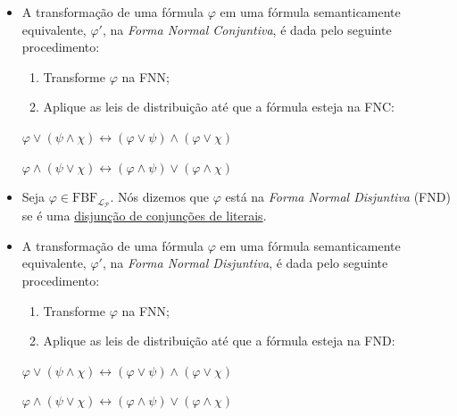 \begin{itemize}[left=0.5cm, align=left, nosep]
            \item A transformação de uma fórmula $\varphi$ em uma fórmula semanticamente equivalente, $\varphi'$, na 
            \textit{Forma Normal Conjuntiva}, é dada pelo seguinte procedimento:
            \begin{enumerate}[left=0.5cm, align=left, nosep]
                \item Transforme $\varphi$ na FNN;
                \item Aplique as leis de distribuição até que a fórmula esteja na FNC:
            \end{enumerate}

                \hspace{2cm} $\varphi \vee (\psi \wedge \chi) \leftrightarrow (\varphi \vee \psi) \wedge (\varphi \vee \chi)$

                \hspace{2cm} $\varphi \wedge (\psi \vee \chi) \leftrightarrow (\varphi \wedge \psi) \vee (\varphi \wedge \chi)$
            
            \item Seja $\varphi \in \text{FBF}_{\mathcal{L_P}}$. Nós dizemos que $\varphi$ está na \textit{Forma Normal Disjuntiva}
            (FND) se é uma \underline{disjunção de conjunções de literais}.

            \item A transformação de uma fórmula $\varphi$ em uma fórmula semanticamente equivalente, $\varphi'$, na 
            \textit{Forma Normal Disjuntiva}, é dada pelo seguinte procedimento:
            \begin{enumerate}[left=0.5cm, align=left, nosep]
                \item Transforme $\varphi$ na FNN;
                \item Aplique as leis de distribuição até que a fórmula esteja na FND:
            \end{enumerate}

            \hspace{2cm} $\varphi \vee (\psi \wedge \chi) \leftrightarrow (\varphi \vee \psi) \wedge (\varphi \vee \chi)$

            \hspace{2cm} $\varphi \wedge (\psi \vee \chi) \leftrightarrow (\varphi \wedge \psi) \vee (\varphi \wedge \chi)$ 

        \end{itemize}

